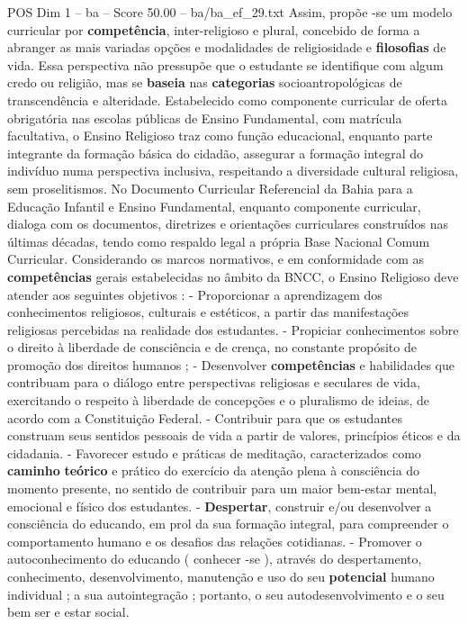 \begin{textsample}{POS Dim 1 – ba – Score 50.00 – ba/ba\_ef\_29.txt}
Assim, propõe -se um modelo curricular por \textbf{competência}, inter-religioso e plural, concebido de forma a abranger as mais variadas opções e modalidades de religiosidade e \textbf{filosofias} de vida.
Essa perspectiva não pressupõe que o estudante se identifique com algum credo ou religião, mas se \textbf{baseia} nas \textbf{categorias} socioantropológicas de transcendência e alteridade.
Estabelecido como componente curricular de oferta obrigatória nas escolas públicas de Ensino Fundamental, com matrícula facultativa, o Ensino Religioso traz como função educacional, enquanto parte integrante da formação básica do cidadão, assegurar a formação integral do indivíduo numa perspectiva inclusiva, respeitando a diversidade cultural religiosa, sem proselitismos.
No Documento Curricular Referencial da Bahia para a Educação Infantil e Ensino Fundamental, enquanto componente curricular, dialoga com os documentos, diretrizes e orientações curriculares construídos nas últimas décadas, tendo como respaldo legal a própria Base Nacional Comum Curricular.
Considerando os marcos normativos, e em conformidade com as \textbf{competências} gerais estabelecidas no âmbito da BNCC, o Ensino Religioso deve atender aos seguintes objetivos : - Proporcionar a aprendizagem dos conhecimentos religiosos, culturais e estéticos, a partir das manifestações religiosas percebidas na realidade dos estudantes. - Propiciar conhecimentos sobre o direito à liberdade de consciência e de crença, no constante propósito de promoção dos direitos humanos ; - Desenvolver \textbf{competências} e habilidades que contribuam para o diálogo entre perspectivas religiosas e seculares de vida, exercitando o respeito à liberdade de concepções e o pluralismo de ideias, de acordo com a Constituição Federal. - Contribuir para que os estudantes construam seus sentidos pessoais de vida a partir de valores, princípios éticos e da cidadania. - Favorecer estudo e práticas de meditação, caracterizados como \textbf{caminho} \textbf{teórico} e prático do exercício da atenção plena à consciência do momento presente, no sentido de contribuir para um maior bem-estar mental, emocional e físico dos estudantes. - \textbf{Despertar}, construir e/ou desenvolver a consciência do educando, em prol da sua formação integral, para compreender o comportamento humano e os desafios das relações cotidianas. - Promover o autoconhecimento do educando ( conhecer -se ), através do despertamento, conhecimento, desenvolvimento, manutenção e uso do seu \textbf{potencial} humano individual ; a sua autointegração ; portanto, o seu autodesenvolvimento e o seu bem ser e estar social.

\end{textsample}
